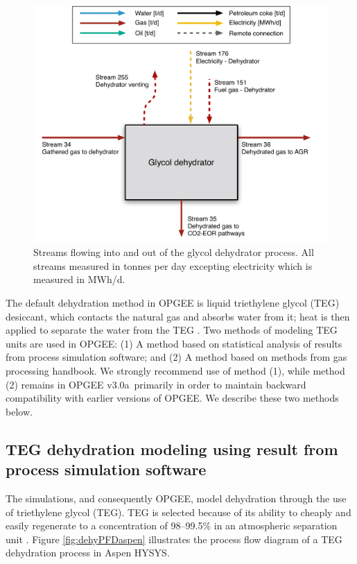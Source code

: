 \documentclass[11pt]{report}
\newcommand{\version}{v3.0a}
\begin{document}
\begin{figure}
\includegraphics[width=0.85\columnwidth]{images/Glycol_dehydrator_PF.pdf}
\caption{Streams flowing into and out of the glycol dehydrator process. All streams measured in tonnes per day excepting electricity which is measured in MWh/d.}
\label{fig:glycol_dehydrator_PF}
\end{figure}


The default dehydration method in OPGEE is liquid triethylene glycol (TEG) desiccant, which contacts the natural gas and absorbs water from it; heat is then applied to separate the water from the TEG \cite[p. 140]{Manning1991}. Two methods of modeling TEG units are used in OPGEE: (1) A method based on statistical analysis of results from process simulation software; and (2) A method based on methods from gas processing handbook. We strongly recommend use of method (1), while method (2) remains in OPGEE \version \, primarily in order to maintain backward compatibility with earlier versions of OPGEE.  We describe these two methods below.

\subsection{TEG dehydration modeling using result from process simulation software}

The simulations, and consequently OPGEE, model dehydration through the use of triethylene glycol (TEG). TEG is selected because of its ability to cheaply and easily regenerate to a concentration of 98--99.5\% in an atmospheric separation unit \cite{Manning1991}. Figure \ref{fig:dehyPFDaspen} illustrates the process flow diagram of a TEG dehydration process in Aspen HYSYS.
\end{document}
